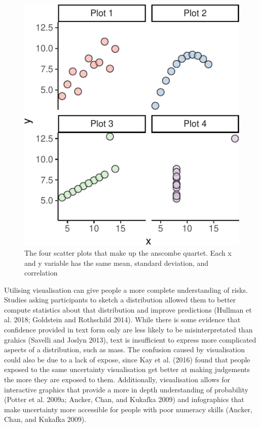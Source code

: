 \documentclass[
  letterpaper,
  DIV=11,
  numbers=noendperiod]{scrartcl}
\begin{document}
\begin{figure}

{\centering \includegraphics{confirmationreport_files/figure-pdf/fig-anscombe-1.pdf}

}

\caption{\label{fig-anscombe}The four scatter plots that make up the
anscombe quartet. Each x and y variable has the same mean, standard
deviation, and correlation}

\end{figure}

Utilising visualisation can give people a more complete understanding of
risks. Studies asking participants to sketch a distribution allowed them
to better compute statistics about that distribution and improve
predictions (Hullman et al. 2018; Goldstein and Rothschild 2014). While
there is some evidence that confidence provided in text form only are
less likely to be misinterpretated than grahics (Savelli and Joslyn
2013), text is insufficient to express more complicated aspects of a
distribution, such as mass. The confusion caused by visualisation could
also be due to a lack of expose, since Kay et al. (2016) found that
people exposed to the same uncertainty visualisation get better at
making judgements the more they are exposed to them. Additionally,
visualisation allows for interactive graphics that provide a more in
depth understanding of probability (Potter et al. 2009a; Ancker, Chan,
and Kukafka 2009) and infographics that make uncertainty more accessible
for people with poor numeracy skills (Ancker, Chan, and Kukafka 2009).
\end{document}
